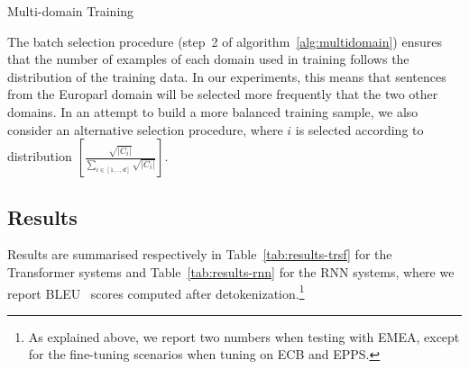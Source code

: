 \documentclass[a4paper]{article}
\newcommand{\fyTodo}[1]{\Todo[FY:]{\textcolor{orange}{#1}}}
\begin{document}
\begin{algorithm}[h]
\caption{Multi-domain Training}
\label{alg:multidomain}
\begin{algorithmic}[1]
\REPEAT 
{}
\end{algorithmic}
\end{algorithm}


The batch selection procedure (step~2 of algorithm~\ref{alg:multidomain}) ensures that the number of examples of each domain used in training  follows the distribution of the training data.
In our experiments, this means that sentences from the Europarl domain will be selected more frequently that the two other domains. In an attempt to build a more balanced training sample, we also consider an alternative selection procedure, where $i$ is selected according to  distribution $[\frac{\sqrt{|C_i|}}{\sum_{i\in [1,..,d]}\sqrt{|C_i|}}]$.

\subsection{Results \label{ssec:results}}

Results are summarised respectively in Table~\ref{tab:results-trsf} for the Transformer systems and Table~\ref{tab:results-rnn} for the RNN systems, where we report BLEU~\cite{Papineni02bleu} scores computed after detokenization.\footnote{As explained above, we  report two numbers when testing with EMEA, except for the fine-tuning scenarios when tuning on ECB and EPPS.} %
\end{document}
